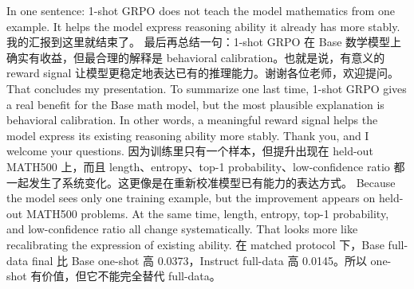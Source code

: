{}In one sentence: 1-shot GRPO does not teach the model mathematics from one example. It helps the model express reasoning ability it already has more stably.\markdownRendererInterblockSeparator
{}\markdownRendererHorizontalRule{}\markdownRendererInterblockSeparator
{}\markdownRendererInterblockSeparator
{}\markdownRendererInterblockSeparator
{}我的汇报到这里就结束了。\markdownRendererInterblockSeparator
{}最后再总结一句：1-shot GRPO 在 Base 数学模型上确实有收益，但最合理的解释是 behavioral calibration。也就是说，有意义的 reward signal 让模型更稳定地表达已有的推理能力。谢谢各位老师，欢迎提问。\markdownRendererInterblockSeparator
{}\markdownRendererInterblockSeparator
{}That concludes my presentation.\markdownRendererInterblockSeparator
{}To summarize one last time, 1-shot GRPO gives a real benefit for the Base math model, but the most plausible explanation is behavioral calibration. In other words, a meaningful reward signal helps the model express its existing reasoning ability more stably. Thank you, and I welcome your questions.\markdownRendererInterblockSeparator
{}\markdownRendererHorizontalRule{}\markdownRendererInterblockSeparator
{}\markdownRendererInterblockSeparator
{}\markdownRendererInterblockSeparator
{}\markdownRendererInterblockSeparator
{}因为训练里只有一个样本，但提升出现在 held-out MATH500 上，而且 length、entropy、top-1 probability、low-confidence ratio 都一起发生了系统变化。这更像是在重新校准模型已有能力的表达方式。\markdownRendererInterblockSeparator
{}\markdownRendererInterblockSeparator
{}Because the model sees only one training example, but the improvement appears on held-out MATH500 problems. At the same time, length, entropy, top-1 probability, and low-confidence ratio all change systematically. That looks more like recalibrating the expression of existing ability.\markdownRendererInterblockSeparator
{}\markdownRendererInterblockSeparator
{}\markdownRendererInterblockSeparator
{}在 matched protocol 下，Base full-data final 比 Base one-shot 高 0.0373，Instruct full-data 高 0.0145。所以 one-shot 有价值，但它不能完全替代 full-data。\markdownRendererInterblockSeparator
